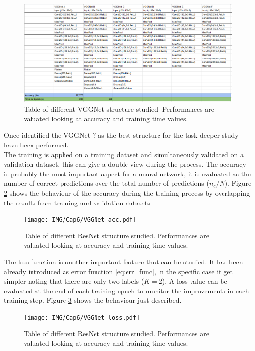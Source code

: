 \begin{figure}
	\centering
	\includegraphics[width=1.\textwidth]{IMG/Cap6/VGGNet-Tab.png}
	\caption{Table of different VGGNet structure studied. Performances are valuated looking at accuracy and training time values.}
	\label{fig:VGGNet-tested}
\end{figure}

Once identified the VGGNet ? as the best structure for the task deeper study have been performed.\\
The training is applied on a training dataset and simultaneously validated on a validation dataset, this can give a double view during the process.
The accuracy is probably the most important aspect for a neural network, it is evaluated as the number of correct predictions over the total number of predictions ($n_c/N$). Figure \ref{fig:VGGNet-acc} shows the behaviour of the accuracy during the training process by overlapping the results from training and validation datasets.\\

\begin{figure}
	\centering
	\texttt{[image: IMG/Cap6/VGGNet-acc.pdf]}
	\caption{Table of different ResNet structure studied. Performances are valuated looking at accuracy and training time values.}
	\label{fig:VGGNet-acc}
\end{figure}

The loss function is another important feature that can be studied. It has been already introduced as error function \ref{eq:err_func}, in the specific case it get simpler noting that there are only two labels ($K = 2$). A loss value can be evaluated at the end of each training epoch to monitor the improvements in each training step. Figure \ref{fig:VGGNet-loss} shows the behaviour just described.\\

\begin{figure}
	\centering
	\texttt{[image: IMG/Cap6/VGGNet-loss.pdf]}
	\caption{Table of different ResNet structure studied. Performances are valuated looking at accuracy and training time values.}
	\label{fig:VGGNet-loss}
\end{figure}

